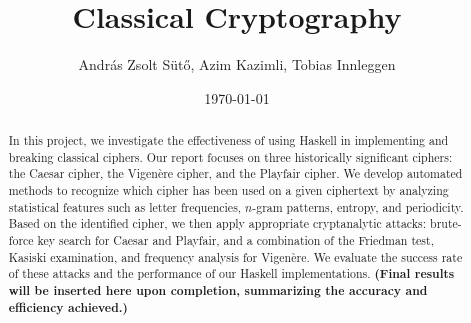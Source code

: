 \documentclass[12pt,a4paper]{article}
\title{Classical Cryptography}
\author{András Zsolt Sütő, Azim Kazimli, Tobias Innleggen}
\date{\today}
\begin{document}
\maketitle


\begin{abstract}
    In this project, we investigate the effectiveness of using Haskell
     in implementing and breaking classical ciphers. Our report focuses on three historically significant ciphers: the Caesar cipher, 
    the Vigen\`ere cipher, and the Playfair cipher. We develop automated methods to recognize which cipher has been used on a given ciphertext by analyzing statistical 
    features such as letter frequencies, $n$-gram patterns, entropy, and periodicity. Based on the identified cipher, we then apply appropriate cryptanalytic attacks: 
    brute-force key search for Caesar and Playfair, and a combination of the Friedman test, Kasiski examination, and frequency analysis for Vigen\`ere. We evaluate the
     success rate of these attacks and the performance of our Haskell implementations. 
      \textbf{(Final results will be inserted here upon completion, summarizing the accuracy and efficiency achieved.)}
    \end{abstract}
\vfill

\tableofcontents

\clearpage

























\end{document}
